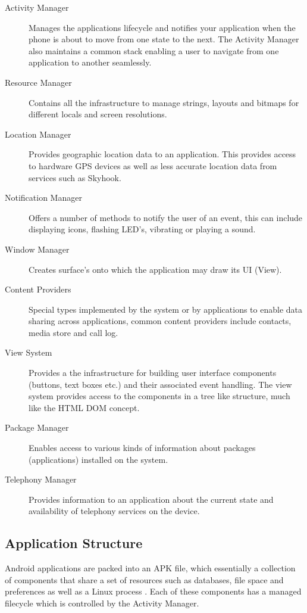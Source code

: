 \begin{description}
\item[Activity Manager] Manages the applications lifecycle and notifies your application when the phone is about to move from one state to the next. The Activity Manager also maintains a common stack enabling a user to navigate from one application to another seamlessly.
\item[Resource Manager] Contains all the infrastructure to manage strings, layouts and bitmaps for different locals and screen resolutions.
\item[Location Manager] Provides geographic location data to an application. This provides access to hardware GPS devices as well as less accurate location data from services such as Skyhook.
\item[Notification Manager] Offers a number of methods to notify the user of an event, this can include displaying icons, flashing LED’s, vibrating or playing a sound.
\item[Window Manager] Creates surface’s onto which the application may draw its UI (View).
\item[Content Providers] Special types implemented by the system or by applications to enable data sharing across applications, common content providers include contacts, media store and call log.
\item[View System] Provides a the infrastructure for building user interface components (buttons, text boxes etc.) and their associated event handling. The view system provides access to the components in a tree like structure, much like the HTML DOM concept.
\item[Package Manager] Enables access to various kinds of information about packages (applications) installed on the system.
\item[Telephony Manager] Provides information to an application about the current state and availability of telephony services on the device. 
\end{description}


\subsection{Application Structure}

Android applications are packed into an APK file, which essentially a collection of components that share a set of resources such as databases, file space and preferences as well as a Linux process \cite{googioappframework08}. Each of these components has a managed filecycle which is controlled by the Activity Manager.

